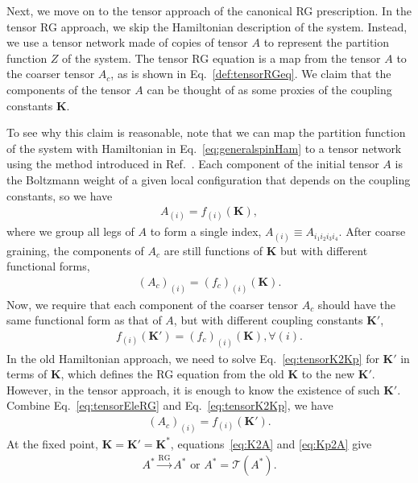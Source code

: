 \documentclass[aps,prb,reprint,superscriptaddress,floatfix]{revtex4-2}
\begin{document}
Next, we move on to the tensor approach of the canonical RG prescription.
In the tensor RG approach, we skip the Hamiltonian description of the system. 
Instead, we use a tensor network made of copies of tensor $A$ to represent the partition function $Z$ of the system. 
The tensor RG equation is a map from the tensor $A$ to the coarser tensor $A_c$, as is shown in Eq.~\eqref{def:tensorRGeq}.
We claim that the components of the tensor $A$ can be thought of as some proxies of the coupling constants $\mathbf{K}$.
%

To see why this claim is reasonable, note that we can map the partition function of the system with Hamiltonian in Eq.~\eqref{eq:generalspinHam} to a tensor network using the method introduced in Ref.~\cite{trg}. 
Each component of the initial tensor $A$ is the Boltzmann weight of a given local configuration that depends on the coupling constants, so we have 
%
\begin{align}\label{eq:K2A}
    A_{(i)} = f_{(i)}\left(\mathbf{K}\right),
\end{align}
%
where we group all legs of $A$ to form a single index, $A_{(i)}\equiv A_{i_1 i_2 i_3 i_4}$. 
After coarse graining, the components of $A_c$ are still functions of $\mathbf{K}$ but
with different functional forms,
%
\begin{align}\label{eq:tensorEleRG}
    \left(A_c\right)_{(i)} =
\left(f_c\right)_{(i)}\left(\mathbf{K}\right).
\end{align}
%
Now, we require that each component of the coarser tensor $A_c$ should have the same functional form as that of $A$, but with different coupling constants $\mathbf{K}'$,
%
\begin{align}\label{eq:tensorK2Kp}
    f_{(i)}\left(\mathbf{K}'\right) =
    \left(f_c\right)_{(i)}\left(\mathbf{K}\right), \forall (i).
\end{align}
%
In the old Hamiltonian approach, we need to solve Eq.~\eqref{eq:tensorK2Kp} for $\mathbf{K}'$ in terms of $\mathbf{K}$, which defines the RG equation from the old $\mathbf{K}$ to the new $\mathbf{K}'$. 
However, in the tensor approach, it is enough to know the existence of such $\mathbf{K}'$. Combine Eq.~\eqref{eq:tensorEleRG} and Eq.~\eqref{eq:tensorK2Kp}, we have
%
\begin{align}\label{eq:Kp2A}
    \left(A_c\right)_{(i)} = f_{(i)}\left(\mathbf{K}'\right).
\end{align}
%
At the fixed point, $\mathbf{K} = \mathbf{K}' = \mathbf{K}^*$, equations~\eqref{eq:K2A} and \eqref{eq:Kp2A} give
%
\begin{align}\label{eq:tensorRGAstar}
    A^* \xrightarrow{\text{RG}} A^* \text{ or }A^* = \mathcal{T}\left(A^* \right).
\end{align}
\end{document}

